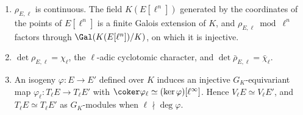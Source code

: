 \begin{proposition}\label{prop:ellcurves:rho}
\leavevmode
\begin{enumerate}[label=(\roman*)]
\item $\rho_{E,\ell}$ is continuous. The field $K(E[\ell^n])$ generated by the coordinates of the points of $E[\ell^n]$ is a finite Galois extension of $K$, and $\rho_{E,\ell}\bmod\ell^n$
factors through $\Gal(K(E[\ell^n])/K)$, on which it is injective.
\item $\det\rho_{E,\ell}=\chi_\ell$, the $\ell$-adic cyclotomic character, and $\det\bar\rho_{E,\ell}=\bar\chi_\ell$.
\item An isogeny $\varphi\colon E\to E'$ defined over $K$ induces an injective $G_K$-equivariant map $\varphi_\ell\colon T_\ell E\to T_\ell E'$ with
$\coker\varphi_\ell\simeq(\ker\varphi)[\ell^\infty]$. Hence $V_\ell E\simeq V_\ell E'$, and $T_\ell E\simeq T_\ell E'$ as $G_K$-modules when $\ell\nmid\deg\varphi$.
\end{enumerate}
\end{proposition}

